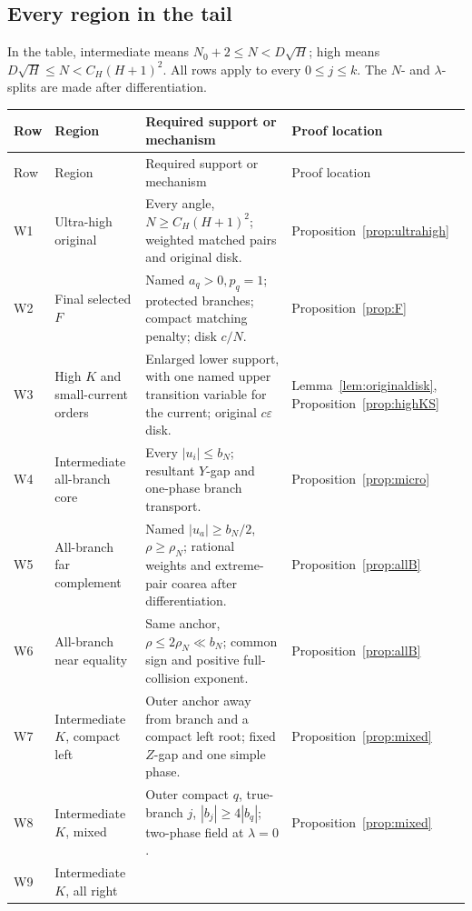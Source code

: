 \documentclass[11pt]{article}
\numberwithin{equation}{section}
\theoremstyle{definition}
\newcommand{\eps}{\varepsilon}
\begin{document}
\subsection{Every region in the tail}
In the table, intermediate means \(N_0+2\le N<D\sqrt H\);
high means \(D\sqrt H\le N<C_H(H+1)^2\).
All rows apply to every \(0\le j\le k\). The \(N\)- and
\(\lambda\)-splits are made after differentiation.
\small
\setlength{\tabcolsep}{4pt}
\begin{longtable}{>{\raggedright\arraybackslash}p{}>{\raggedright\arraybackslash}p{}>{\raggedright\arraybackslash}p{}>{\raggedright\arraybackslash}p{}}
\toprule
Row & Region & Required support or mechanism & Proof location\\
\midrule
\endfirsthead
\toprule
Row & Region & Required support or mechanism & Proof location\\
\midrule
\endhead
W1 & Ultra-high original &
Every angle, \(N\ge C_H(H+1)^2\); weighted matched pairs and
original disk. & Proposition~\ref{prop:ultrahigh}\\
W2 & Final selected \(F\) &
Named \(a_q>0,p_q=1\); protected branches; compact matching
penalty; disk \(c/N\). & Proposition~\ref{prop:F}\\
W3 & High \(K\) and small-current orders &
Enlarged lower support, with one named upper transition
variable for the current; original \(c\eps\) disk. &
Lemma~\ref{lem:originaldisk}, Proposition~\ref{prop:highKS}\\
W4 & Intermediate all-branch core &
Every \(|u_i|\le b_N\); resultant \(Y\)-gap and one-phase
branch transport. & Proposition~\ref{prop:micro}\\
W5 & All-branch far complement &
Named \(|u_a|\ge b_N/2\), \(\rho\ge\rho_N\); rational
weights and extreme-pair coarea after differentiation. &
Proposition~\ref{prop:allB}\\
W6 & All-branch near equality &
Same anchor, \(\rho\le2\rho_N\ll b_N\); common sign and
positive full-collision exponent. & Proposition~\ref{prop:allB}\\
W7 & Intermediate \(K\), compact left &
Outer anchor away from branch and a compact left root;
fixed \(Z\)-gap and one simple phase. & Proposition~\ref{prop:mixed}\\
W8 & Intermediate \(K\), mixed &
Outer compact \(q\), true-branch \(j\), \(|b_j|\ge4|b_q|\);
two-phase field at \(\lambda=0\). & Proposition~\ref{prop:mixed}\\
W9 & Intermediate \(K\), all right &

\end{longtable}
\end{document}

